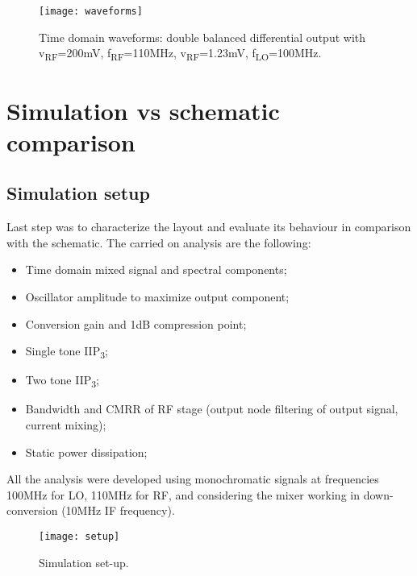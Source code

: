 
\begin{figure}[H]
	\centering
	\texttt{[image: waveforms]}
	\caption{Time domain waveforms: double balanced differential output with v\textsubscript{RF}=200mV,  f\textsubscript{RF}=110MHz, v\textsubscript{RF}=1.23mV, f\textsubscript{LO}=100MHz.}
	\label{fig:TdomaniWF}
\end{figure}


\section{Simulation vs schematic comparison}

\subsection{Simulation setup}
Last step was to characterize the layout and evaluate its behaviour in comparison with the schematic. The carried on analysis are the following:
\begin{itemize}
	\item Time domain mixed signal and spectral components;
	\item Oscillator amplitude to maximize output component;
	\item Conversion gain and 1dB compression point;
	\item Single tone IIP\textsubscript{3};
	\item Two tone IIP\textsubscript{3};
	\item Bandwidth and CMRR of RF stage (output node filtering of output signal, current mixing);
	\item Static power dissipation;
\end{itemize}
All the analysis were developed using monochromatic signals at frequencies 100MHz for LO, 110MHz for RF, and considering the mixer working in down-conversion (10MHz IF frequency).
\begin{figure}[H]
	\centering %
	\texttt{[image: setup]}
	\caption{Simulation set-up.}
	\label{fig:setup}
\end{figure}

